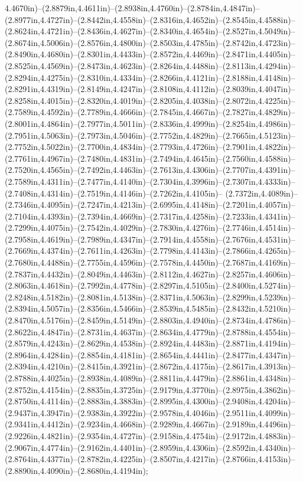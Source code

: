 4.4670in)--(2.8879in,4.4611in)--(2.8938in,4.4760in)--(2.8784in,4.4847in)--(2.8977in,4.4727in)--(2.8442in,4.4558in)--(2.8316in,4.4652in)--(2.8545in,4.4588in)--(2.8624in,4.4721in)--(2.8436in,4.4627in)--(2.8340in,4.4654in)--(2.8527in,4.5049in)--(2.8674in,4.5006in)--(2.8576in,4.4800in)--(2.8503in,4.4785in)--(2.8742in,4.4723in)--(2.8490in,4.4680in)--(2.8301in,4.4433in)--(2.8572in,4.4469in)--(2.8471in,4.4405in)--(2.8525in,4.4569in)--(2.8473in,4.4623in)--(2.8264in,4.4488in)--(2.8113in,4.4294in)--(2.8294in,4.4275in)--(2.8310in,4.4334in)--(2.8266in,4.4121in)--(2.8188in,4.4148in)--(2.8291in,4.4319in)--(2.8149in,4.4247in)--(2.8108in,4.4112in)--(2.8039in,4.4047in)--(2.8258in,4.4015in)--(2.8320in,4.4019in)--(2.8205in,4.4038in)--(2.8072in,4.4225in)--(2.7589in,4.4592in)--(2.7789in,4.4666in)--(2.7845in,4.4667in)--(2.7827in,4.4829in)--(2.8001in,4.4864in)--(2.7977in,4.5011in)--(2.8336in,4.4999in)--(2.8254in,4.4986in)--(2.7951in,4.5063in)--(2.7973in,4.5046in)--(2.7752in,4.4829in)--(2.7665in,4.5123in)--(2.7752in,4.5022in)--(2.7700in,4.4834in)--(2.7793in,4.4726in)--(2.7901in,4.4822in)--(2.7761in,4.4967in)--(2.7480in,4.4831in)--(2.7494in,4.4645in)--(2.7560in,4.4588in)--(2.7520in,4.4565in)--(2.7492in,4.4463in)--(2.7613in,4.4306in)--(2.7707in,4.4391in)--(2.7589in,4.4311in)--(2.7477in,4.4140in)--(2.7304in,4.3996in)--(2.7307in,4.4333in)--(2.7408in,4.4314in)--(2.7519in,4.4146in)--(2.7262in,4.4105in)--
(2.7372in,4.4089in)--(2.7346in,4.4095in)--(2.7247in,4.4213in)--(2.6995in,4.4148in)--(2.7201in,4.4057in)--(2.7104in,4.4393in)--(2.7394in,4.4669in)--(2.7317in,4.4258in)--(2.7233in,4.4341in)--(2.7299in,4.4075in)--(2.7542in,4.4029in)--(2.7830in,4.4276in)--(2.7746in,4.4514in)--(2.7958in,4.4619in)--(2.7989in,4.4347in)--(2.7914in,4.4558in)--(2.7676in,4.4531in)--(2.7669in,4.4374in)--(2.7611in,4.4263in)--(2.7798in,4.4143in)--(2.7866in,4.4265in)--(2.7680in,4.4488in)--(2.7755in,4.4596in)--(2.7578in,4.4450in)--(2.7687in,4.4169in)--(2.7837in,4.4432in)--(2.8049in,4.4463in)--(2.8112in,4.4627in)--(2.8257in,4.4606in)--(2.8063in,4.4618in)--(2.7992in,4.4778in)--(2.8297in,4.5105in)--(2.8400in,4.5274in)--(2.8248in,4.5182in)--(2.8081in,4.5138in)--(2.8371in,4.5063in)--(2.8299in,4.5239in)--(2.8394in,4.5057in)--(2.8356in,4.5466in)--(2.8539in,4.5485in)--(2.8432in,4.5210in)--(2.8470in,4.5176in)--(2.8459in,4.5149in)--(2.8803in,4.4940in)--(2.8734in,4.4786in)--(2.8622in,4.4847in)--(2.8731in,4.4637in)--(2.8634in,4.4779in)--(2.8788in,4.4554in)--(2.8579in,4.4243in)--(2.8629in,4.4538in)--(2.8924in,4.4483in)--(2.8871in,4.4194in)--(2.8964in,4.4284in)--(2.8854in,4.4181in)--(2.8654in,4.4441in)--(2.8477in,4.4347in)--(2.8394in,4.4210in)--(2.8415in,4.3921in)--(2.8672in,4.4175in)--(2.8617in,4.3913in)--(2.8788in,4.4025in)--(2.8938in,4.4089in)--(2.8811in,4.4479in)--(2.8861in,4.4348in)--(2.8752in,4.4154in)--(2.8835in,4.3725in)--(2.9179in,4.3770in)--(2.8975in,4.3862in)--(2.8750in,4.4114in)--(2.8883in,4.3883in)--(2.8995in,4.4300in)--(2.9408in,4.4204in)--(2.9437in,4.3947in)--(2.9383in,4.3922in)--(2.9578in,4.4046in)--(2.9511in,4.4099in)--(2.9341in,4.4412in)--(2.9234in,4.4668in)--(2.9289in,4.4667in)--(2.9189in,4.4496in)--(2.9226in,4.4821in)--(2.9354in,4.4727in)--(2.9158in,4.4754in)--(2.9172in,4.4883in)--(2.9067in,4.4774in)--(2.9162in,4.4401in)--(2.8959in,4.4306in)--(2.8592in,4.4340in)--(2.8764in,4.4377in)--(2.8782in,4.4225in)--(2.8507in,4.4217in)--(2.8766in,4.4153in)--(2.8890in,4.4090in)--(2.8680in,4.4194in);
